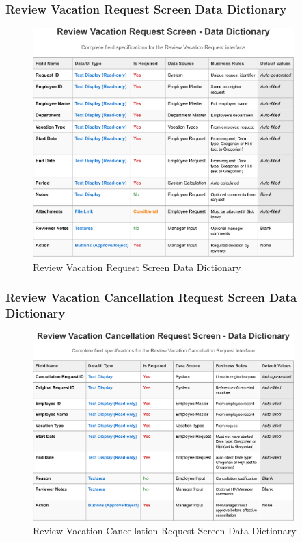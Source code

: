 \documentclass[12pt,a4paper]{article}
\begin{document}
\subsubsection{Review Vacation Request Screen Data Dictionary}
\begin{figure}[H]
\centering
\includegraphics[width=0.9\textwidth]{Data-Dictionary/Screen-Data-Dictionaries/Review-Vacation-Request-Screen-Data-Dictionary/Review-Vacation-Request-Screen-Data-Dictionary-1.png}
\caption{Review Vacation Request Screen Data Dictionary}
\label{fig:review-vacation-data-dict}
\end{figure}

\subsubsection{Review Vacation Cancellation Request Screen Data Dictionary}
\begin{figure}[H]
\centering
\includegraphics[width=0.9\textwidth]{Data-Dictionary/Screen-Data-Dictionaries/Review-Vacation-Cancellation-Request-Screen-Data-Dictionary/Review-Vacation-Cancellation-Request-Screen-Data-Dictionary-1.png}
\caption{Review Vacation Cancellation Request Screen Data Dictionary}
\label{fig:review-cancellation-data-dict}
\end{figure}
\end{document}
